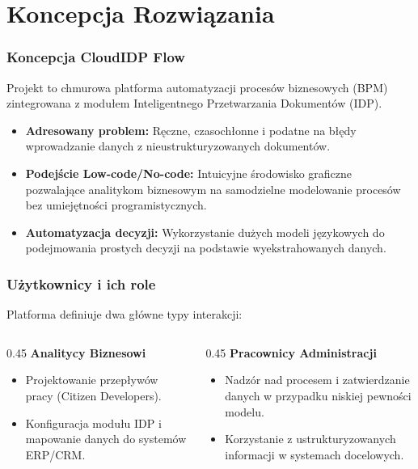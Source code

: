 \documentclass[11pt]{beamer}
\begin{document}
\section{Koncepcja Rozwiązania}

\begin{frame}
    \frametitle{Koncepcja CloudIDP Flow}
    Projekt to chmurowa platforma automatyzacji procesów biznesowych (BPM) zintegrowana z modułem Inteligentnego Przetwarzania Dokumentów (IDP).

    \bigskip
    \begin{itemize}
        \item \textbf{Adresowany problem:} Ręczne, czasochłonne i podatne na błędy wprowadzanie danych z nieustrukturyzowanych dokumentów.
        \item \textbf{Podejście Low-code/No-code:} Intuicyjne środowisko graficzne pozwalające analitykom biznesowym na samodzielne modelowanie procesów bez umiejętności programistycznych.
        \item \textbf{Automatyzacja decyzji:} Wykorzystanie dużych modeli językowych do podejmowania prostych decyzji na podstawie wyekstrahowanych danych.
    \end{itemize}
\end{frame}

\begin{frame}
    \frametitle{Użytkownicy i ich role}
    Platforma definiuje dwa główne typy interakcji:
    
    \begin{columns}[t]
        \begin{column}{0.45\textwidth}
            \textbf{Analitycy Biznesowi}
            \begin{itemize}
                \item Projektowanie przepływów pracy (Citizen Developers).
                \item Konfiguracja modułu IDP i mapowanie danych do systemów ERP/CRM.
            \end{itemize}
        \end{column}
        \begin{column}{0.45\textwidth}
            \textbf{Pracownicy Administracji}
            \begin{itemize}
                \item Nadzór nad procesem i zatwierdzanie danych w przypadku niskiej pewności modelu.
                \item Korzystanie z ustrukturyzowanych informacji w systemach docelowych.
            \end{itemize}
        \end{column}
    \end{columns}
\end{frame}
\end{document}
